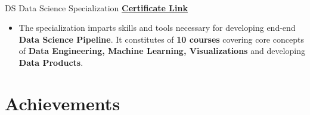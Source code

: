 \documentclass[letterpaper]{DS_class_file} %
\begin{document}
\begin{twenty}
    \\
    \twentyitem
	{DS}
	{}
	{\hspace{0.3cm} Data Science Specialization}
    {\href{https://coursera.org/share/bd6b7bd9ba1f00e2975568b2f471d170}{\textbf{Certificate Link}}}
	{}
	{
    \begin{itemize}
        \item The specialization imparts skills and tools necessary for developing end-end \textbf{Data Science Pipeline}. It constitutes of \textbf{10 courses} covering core concepts of \textbf{Data Engineering, Machine Learning, Visualizations} and developing \textbf{Data Products}.   
    \end{itemize}
    }

\end{twenty}


\section{\faTrophy Achievements}
\end{document}
